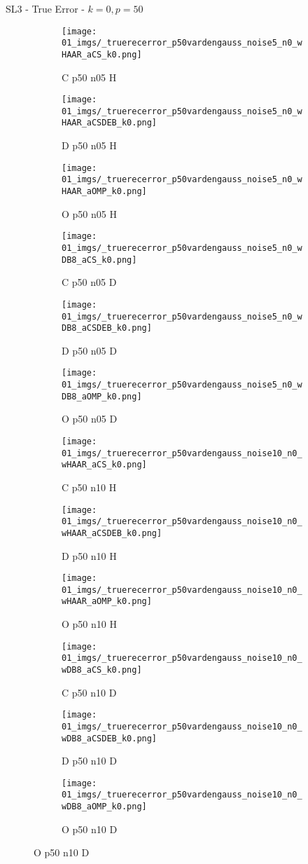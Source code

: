 \begin{frame}{SL3 - True Error - $k=0,p=50$}{}
\begin{figure}
\begin{subfigure}{0.13\textwidth}
\texttt{[image: 01\_imgs/\_truerecerror\_p50vardengauss\_noise5\_n0\_wHAAR\_aCS\_k0.png]}
\caption*{\tiny C p50 n05 H}
\end{subfigure}
\begin{subfigure}{0.13\textwidth}
\texttt{[image: 01\_imgs/\_truerecerror\_p50vardengauss\_noise5\_n0\_wHAAR\_aCSDEB\_k0.png]}
\caption*{\tiny D p50 n05 H}
\end{subfigure}
\begin{subfigure}{0.13\textwidth}
\texttt{[image: 01\_imgs/\_truerecerror\_p50vardengauss\_noise5\_n0\_wHAAR\_aOMP\_k0.png]}
\caption*{\tiny O p50 n05 H}
\end{subfigure}
\begin{subfigure}{0.13\textwidth}
\texttt{[image: 01\_imgs/\_truerecerror\_p50vardengauss\_noise5\_n0\_wDB8\_aCS\_k0.png]}
\caption*{\tiny C p50 n05 D}
\end{subfigure}
\begin{subfigure}{0.13\textwidth}
\texttt{[image: 01\_imgs/\_truerecerror\_p50vardengauss\_noise5\_n0\_wDB8\_aCSDEB\_k0.png]}
\caption*{\tiny D p50 n05 D}
\end{subfigure}
\begin{subfigure}{0.13\textwidth}
\texttt{[image: 01\_imgs/\_truerecerror\_p50vardengauss\_noise5\_n0\_wDB8\_aOMP\_k0.png]}
\caption*{\tiny O p50 n05 D}
\end{subfigure}

\vspace{5pt}

\begin{subfigure}{0.13\textwidth}
\texttt{[image: 01\_imgs/\_truerecerror\_p50vardengauss\_noise10\_n0\_wHAAR\_aCS\_k0.png]}
\caption*{\tiny C p50 n10 H}
\end{subfigure}
\begin{subfigure}{0.13\textwidth}
\texttt{[image: 01\_imgs/\_truerecerror\_p50vardengauss\_noise10\_n0\_wHAAR\_aCSDEB\_k0.png]}
\caption*{\tiny D p50 n10 H}
\end{subfigure}
\begin{subfigure}{0.13\textwidth}
\texttt{[image: 01\_imgs/\_truerecerror\_p50vardengauss\_noise10\_n0\_wHAAR\_aOMP\_k0.png]}
\caption*{\tiny O p50 n10 H}
\end{subfigure}
\begin{subfigure}{0.13\textwidth}
\texttt{[image: 01\_imgs/\_truerecerror\_p50vardengauss\_noise10\_n0\_wDB8\_aCS\_k0.png]}
\caption*{\tiny C p50 n10 D}
\end{subfigure}
\begin{subfigure}{0.13\textwidth}
\texttt{[image: 01\_imgs/\_truerecerror\_p50vardengauss\_noise10\_n0\_wDB8\_aCSDEB\_k0.png]}
\caption*{\tiny D p50 n10 D}
\end{subfigure}
\begin{subfigure}{0.13\textwidth}
\texttt{[image: 01\_imgs/\_truerecerror\_p50vardengauss\_noise10\_n0\_wDB8\_aOMP\_k0.png]}
\caption*{\tiny O p50 n10 D}
\end{subfigure}


\end{figure}
\end{frame}
